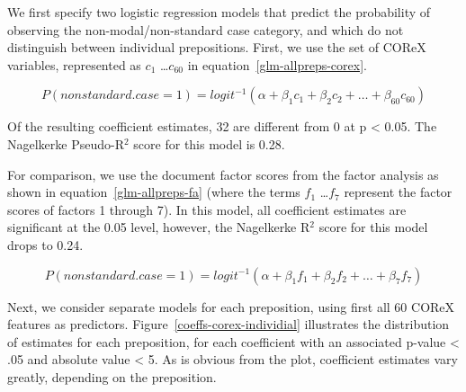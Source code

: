 We first specify two logistic regression models that predict the probability of observing the non-modal/non-standard case category, and which do not distinguish between individual prepositions.
First, we use the set of COReX variables, represented as $c_1$ \ldots $c_{60}$ in equation~\ref{glm-allpreps-corex}.

\begin{equation}
\label{glm-allpreps-corex}
  P(nonstandard.case=1) = logit^{-1}(\alpha + \beta_1 c_1 + \beta_2 c_2 + \dots + \beta_{60} c_{60})
\end{equation}


Of the resulting coefficient estimates, 32 are different from 0 at p < 0.05. The Nagelkerke Pseudo-R$^2$ score for this model is 0.28.

For comparison, we use the document factor scores from the factor analysis as shown in equation~\ref{glm-allpreps-fa} (where the terms $f_1$ \ldots $f_7$ represent the factor scores of factors 1 through 7). In this model, all coefficient estimates are significant at the 0.05 level, however, the Nagelkerke R$^2$ score for this model drops to 0.24.

\begin{equation}
\label{glm-allpreps-fa}
  P(nonstandard.case=1) = logit^{-1}(\alpha + \beta_1 f_1 + \beta_2 f_2 + \dots + \beta_{7} f_{7})
\end{equation}


Next, we consider separate models for each preposition, using first all 60 COReX features as predictors. Figure~\ref{coeffs-corex-individial} illustrates the distribution of estimates for each preposition, for each coefficient with an associated p-value < .05 and absolute value < 5. As is obvious from the plot, coefficient estimates vary greatly, depending on the preposition. 

